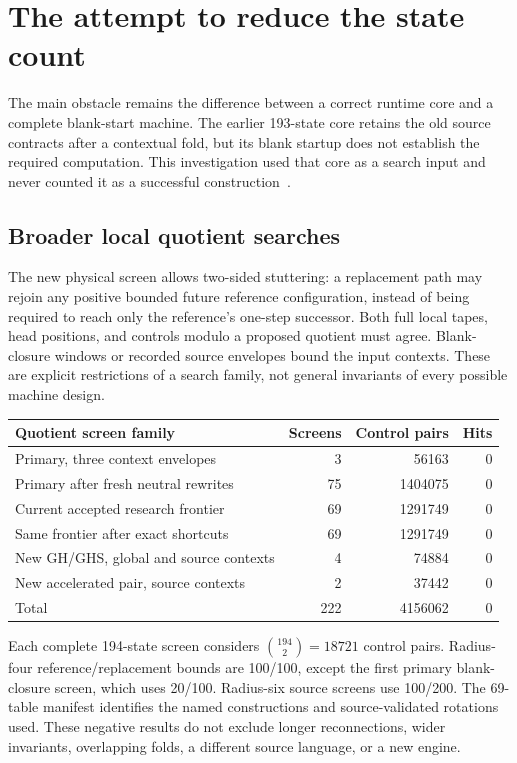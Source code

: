 \section{The attempt to reduce the state count}
\label{sec:search}

The main obstacle remains the difference between a correct runtime core
and a complete blank-start machine. The earlier 193-state core retains
the old source contracts after a contextual fold, but its blank startup
does not establish the required computation. This investigation used that
core as a search input and never counted it as a successful construction~\cite{reduction}.

\subsection{Broader local quotient searches}

The new physical screen allows two-sided stuttering: a replacement path
may rejoin any positive bounded future reference configuration, instead
of being required to reach only the reference's one-step successor.
Both full local tapes, head positions, and controls modulo a proposed
quotient must agree. Blank-closure windows or recorded source envelopes
bound the input contexts. These are explicit restrictions of a search
family, not general invariants of every possible machine design.

\begin{center}\small
\begin{tabular}{lrrr}
\toprule
Quotient screen family & Screens & Control pairs & Hits\\
\midrule
Primary, three context envelopes & 3 & 56163 & 0\\
Primary after fresh neutral rewrites & 75 & 1404075 & 0\\
Current accepted research frontier & 69 & 1291749 & 0\\
Same frontier after exact shortcuts & 69 & 1291749 & 0\\
New GH/GHS, global and source contexts & 4 & 74884 & 0\\
New accelerated pair, source contexts & 2 & 37442 & 0\\
\midrule
Total & 222 & 4156062 & 0\\
\bottomrule
\end{tabular}
\end{center}
Each complete 194-state screen considers $\binom{194}{2}=18721$
control pairs. Radius-four reference/replacement bounds are 100/100,
except the first primary blank-closure screen, which uses 20/100.
Radius-six source screens use 100/200. The 69-table manifest identifies
the named constructions and source-validated rotations used. These
negative results do not exclude longer reconnections, wider invariants,
overlapping folds, a different source language, or a new engine.

